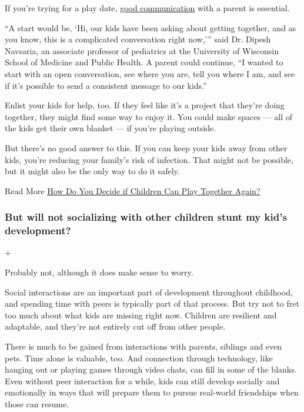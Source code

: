 If you're trying for a play date,
\href{https://www.nytimes.com/2020/06/29/parenting/family-socially-distancing-coronavirus.html}{good
communication} with a parent is essential.

``A start would be, `Hi, our kids have been asking about getting
together, and as you know, this is a complicated conversation right
now,''' said Dr. Dipesh Navsaria, an associate professor of pediatrics
at the University of Wisconsin School of Medicine and Public Health. A
parent could continue, ``I wanted to start with an open conversation,
see where you are, tell you where I am, and see if it's possible to send
a consistent message to our kids.''

Enlist your kids for help, too. If they feel like it's a project that
they're doing together, they might find some way to enjoy it. You could
make spaces --- all of the kids get their own blanket --- if you're
playing outside.

But there's no good answer to this. If you can keep your kids away from
other kids, you're reducing your family's risk of infection. That might
not be possible, but it might also be the only way to do it safely.

 Read More
\href{https://www.nytimes.com/2020/06/01/well/family/coronavirus-reopening-children-parents-play-dates.html}{How
Do You Decide if Children Can Play Together Again?}

\hypertarget{but-will-not-socializing-with-other-children-stunt-my-kids-development}{%
\subsubsection{But will not socializing with other children stunt my
kid's
development?}\label{but-will-not-socializing-with-other-children-stunt-my-kids-development}}

+

Probably not, although it does make sense to worry.

Social interactions are an important part of development throughout
childhood, and spending time with peers is typically part of that
process. But try not to fret too much about what kids are missing right
now. Children are resilient and adaptable, and they're not entirely cut
off from other people.

There is much to be gained from interactions with parents, siblings and
even pets. Time alone is valuable, too. And connection through
technology, like hanging out or playing games through video chats, can
fill in some of the blanks. Even without peer interaction for a while,
kids can still develop socially and emotionally in ways that will
prepare them to pursue real-world friendships when those can resume.

